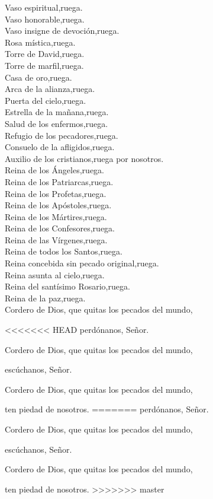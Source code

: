 Vaso espiritual,\hfill ruega.\\
Vaso honorable,\hfill ruega.\\
Vaso insigne de devoción,\hfill ruega.\\
Rosa mística,\hfill ruega.\\
Torre de David,\hfill ruega.\\
Torre de marfil,\hfill ruega.\\
Casa de oro,\hfill ruega.\\
Arca de la alianza,\hfill ruega.\\
Puerta del cielo,\hfill ruega.\\
Estrella de la mañana,\hfill ruega.\\
Salud de los enfermos,\hfill ruega.\\
Refugio de los pecadores,\hfill ruega.\\
Consuelo de la afligidos,\hfill ruega.\\
Auxilio de los cristianos,\hfill ruega por nosotros.\\
Reina de los Ángeles,\hfill ruega.\\
Reina de los Patriarcas,\hfill ruega.\\
Reina de los Profetas,\hfill ruega.\\
Reina de los Apóstoles,\hfill ruega.\\
Reina de los Mártires,\hfill ruega.\\
Reina de los Confesores,\hfill ruega.\\
Reina de las Vírgenes,\hfill ruega.\\
Reina de todos los Santos,\hfill ruega.\\
Reina concebida sin pecado original,\hfill ruega.\\
Reina asunta al cielo,\hfill ruega.\\
Reina del santísimo Rosario,\hfill ruega.\\
Reina de la paz,\hfill ruega.\\
Cordero de Dios, que quitas los pecados del mundo,

<<<<<<< HEAD
\hfill perdónanos, Señor.

Cordero de Dios, que quitas los pecados del mundo,

\hfill escúchanos, Señor.

Cordero de Dios, que quitas los pecados del mundo,

\hfill ten piedad de nosotros.
=======
{\hfill}perdónanos, Señor.

Cordero de Dios, que quitas los pecados del mundo,

{\hfill}escúchanos, Señor.

Cordero de Dios, que quitas los pecados del mundo,

{\hfill}ten piedad de nosotros.
>>>>>>> master
